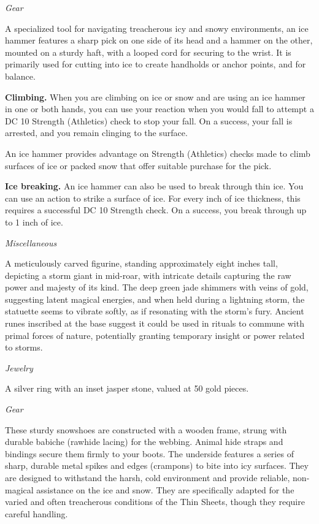 \documentclass[
  letterpaper,12pt,twoside,twocolumn,openany,
  nodeprecatedcode,bg=full]{dndbook}
\begin{document}
{\emph{Gear}}

A specialized tool for navigating treacherous icy and snowy
environments, an ice hammer features a sharp pick on one side of its
head and a hammer on the other, mounted on a sturdy haft, with a looped
cord for securing to the wrist. It is primarily used for cutting into
ice to create handholds or anchor points, and for balance.

\textbf{Climbing.} When you are climbing on ice or snow and are using an
ice hammer in one or both hands, you can use your reaction when you
would fall to attempt a DC 10 Strength (Athletics) check to stop your
fall. On a success, your fall is arrested, and you remain clinging to
the surface.

An ice hammer provides advantage on Strength (Athletics) checks made to
climb surfaces of ice or packed snow that offer suitable purchase for
the pick.

\textbf{Ice breaking.} An ice hammer can also be used to break through
thin ice. You can use an action to strike a surface of ice. For every
inch of ice thickness, this requires a successful DC 10 Strength check.
On a success, you break through up to 1 inch of ice.

{\emph{Miscellaneous}}

A meticulously carved figurine, standing approximately eight inches
tall, depicting a storm giant in mid-roar, with intricate details
capturing the raw power and majesty of its kind. The deep green jade
shimmers with veins of gold, suggesting latent magical energies, and
when held during a lightning storm, the statuette seems to vibrate
softly, as if resonating with the storm's fury. Ancient runes inscribed
at the base suggest it could be used in rituals to commune with primal
forces of nature, potentially granting temporary insight or power
related to storms.

{\emph{Jewelry}}

A silver ring with an inset jasper stone, valued at 50 gold pieces.

{\emph{Gear}}

These sturdy snowshoes are constructed with a wooden frame, strung with
durable babiche (rawhide lacing) for the webbing. Animal hide straps and
bindings secure them firmly to your boots. The underside features a
series of sharp, durable metal spikes and edges (crampons) to bite into
icy surfaces. They are designed to withstand the harsh, cold environment
and provide reliable, non-magical assistance on the ice and snow. They
are specifically adapted for the varied and often treacherous conditions
of the Thin Sheets, though they require careful handling.
\end{document}
